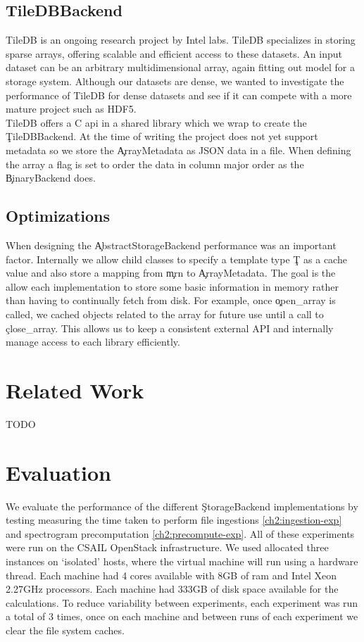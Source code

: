 \subsection{TileDBBackend}

TileDB\cite{tiledb} is an ongoing research project by Intel labs. TileDB
specializes in storing sparse arrays, offering scalable and efficient access to
these datasets. An input dataset can be an arbitrary multidimensional array,
again fitting out model for a storage system. Although our datasets are dense,
we wanted to investigate the performance of TileDB for dense datasets and see
if it can compete with a more mature project such as HDF5.\\

TileDB offers a C api in a shared library which we wrap to create the
\c{TileDBBackend}. At the time of writing the project does not yet support
metadata so we store the \c{ArrayMetadata} as JSON data in a file. When
defining the array a flag is set to order the data in column major order as the
\c{BinaryBackend} does.

\subsection{Optimizations}\label{ch2:opt}

When designing the \c{AbstractStorageBackend} performance was an important
factor. Internally we allow child classes to specify a template type \c{T} as
a cache value and also store a mapping from \c{mrn} to \c{ArrayMetadata}. The
goal is the allow each implementation to store some basic information in memory
rather than having to continually fetch from disk. For example, once
\c{open\_array} is called, we cached objects related to the array for future
use until a call to \c{close\_array}. This allows us to keep a consistent
external API and internally manage access to each library efficiently.

\section{Related Work}
TODO

\section{Evaluation}\label{ch2:evaluation}

We evaluate the performance of the different \c{StorageBackend} implementations
by testing measuring the time taken to perform file ingestions
\ref{ch2:ingestion-exp} and spectrogram precomputation
\ref{ch2:precompute-exp}. All of these experiments were run on the CSAIL
OpenStack infrastructure. We used allocated three instances on `isolated'
hosts, where the virtual machine will run using a hardware thread. Each machine
had 4 cores available with 8GB of ram and Intel Xeon 2.27GHz processors. Each
machine had 333GB of disk space available for the calculations. To reduce
variability between experiments, each experiment was run a total of 3 times,
once on each machine and between runs of each experiment we clear the file
system caches.\\

